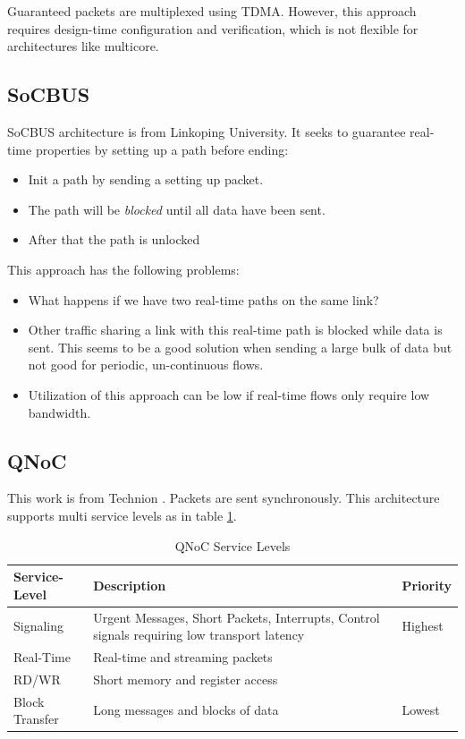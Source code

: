 \documentclass[10pt]{article}
\begin{document}
Guaranteed packets are multiplexed using TDMA. However, this approach requires
design-time configuration and verification, which is not flexible for architectures
like multicore.
\subsection{SoCBUS}
SoCBUS architecture \cite{SoCBUS} is from Linkoping University. It seeks to 
guarantee real-time properties by setting up a path before ending:
\begin{itemize}
\item Init a path by sending a setting up packet.
\item The path will be {\em blocked} until all data have been sent.
\item After that the path is unlocked
\end{itemize}
This approach has the following problems: 
\begin{itemize}
\item What happens if we have two real-time paths on the same link?
\item Other traffic sharing a link with this real-time path is blocked while 
data is sent. This seems to be a good solution when sending a large bulk of data 
but not good for periodic, un-continuous flows.
\item Utilization of this approach can be low if real-time flows only require
low bandwidth.
\end{itemize}
\subsection{QNoC}
This work is from Technion \cite{QNoC}. Packets are sent synchronously. 
This architecture supports multi service levels as in table \ref{table:QNoCTable}.

\begin{table}[h]
\begin{center}
  \begin{tabular}{ | p{2.5cm} | p{6cm} | p{2cm} |}
    \hline
	Service-Level & Description & Priority \\ \hline
	Signaling & Urgent Messages, Short Packets, Interrupts, Control signals 
	requiring low transport latency & Highest \\ \hline
	Real-Time & Real-time and streaming packets & \\ \hline
	RD/WR & Short memory and register access & \\ \hline
	Block Transfer & Long messages and blocks of data & Lowest \\
    \hline
  \end{tabular}
\end{center}
\caption{QNoC Service Levels}
\label{table:QNoCTable}
\end{table}
\end{document}
